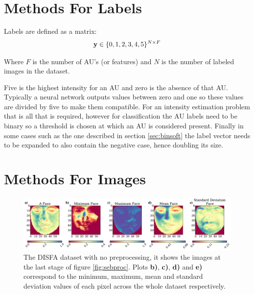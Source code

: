     \section{Methods For Labels}

      Labels are defined as a matrix:
      \begin{equation}
        {\bf y} \in \{0,1,2,3,4,5\}^{N\times F}
      \end{equation}

      Where $F$ is the number of AU's (or features) and $N$ is the number of labeled images
      in the dataset.

      Five is the highest intensity for an AU and zero is the absence of that AU.
      Typically a neural network outputs values between zero and one so these values are divided by five to make them compatible.
      For an intensity estimation problem that is all that is required, however for classification
      the AU labels need to be binary so a threshold is chosen at which an AU is considered present.
      Finally in some cases such as the one described in section \ref{sec:binsoft} the label vector
      needs to be expanded to also contain the negative case, hence doubling its size.

  \section{Methods For Images} \label{sec:methods}

    \begin{figure}[!h] \centering
    \includegraphics[width =\hsize]{figures/faces.pdf}
    \caption{The DISFA dataset with no preprocessing, it shows
    the images at the last stage of figure \ref{fig:sebproc}. Plots {\bf b)}, {\bf c)}, {\bf d)}
    and {\bf e)}
    correspond to the minimum, maximum, mean and standard deviation values of each pixel across
    the whole dataset respectively.} \label{fig:faces_none} \end{figure}

